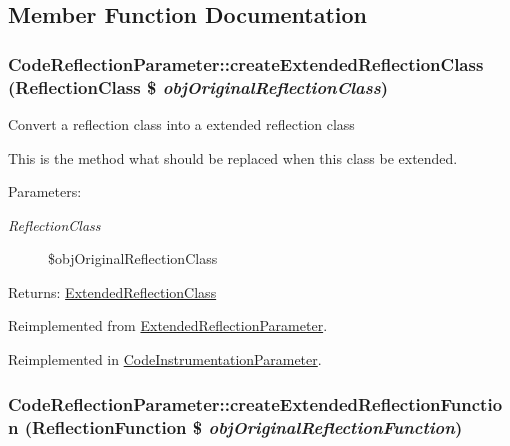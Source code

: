 \subsection{Member Function Documentation}
\hypertarget{class_code_reflection_parameter_a2b9b21f9711afbf11791dd64dcbdd0a}{
\subsubsection[{createExtendedReflectionClass}]{\setlength{\rightskip}{0pt plus 5cm}CodeReflectionParameter::createExtendedReflectionClass (ReflectionClass \$ {\em objOriginalReflectionClass})}}
\label{class_code_reflection_parameter_a2b9b21f9711afbf11791dd64dcbdd0a}


Convert a reflection class into a extended reflection class

This is the method what should be replaced when this class be extended.

\begin{Desc}
\item[Parameters:]
\begin{description}
\item[{\em ReflectionClass}]\$objOriginalReflectionClass \end{description}
\end{Desc}
\begin{Desc}
\item[Returns:]\hyperlink{class_extended_reflection_class}{ExtendedReflectionClass} \end{Desc}


Reimplemented from \hyperlink{class_extended_reflection_parameter_7119682d1601c3398cbad195a4d52b4a}{ExtendedReflectionParameter}.

Reimplemented in \hyperlink{class_code_instrumentation_parameter_4190025f9ec55f58f10b36084a8851fd}{CodeInstrumentationParameter}.\hypertarget{class_code_reflection_parameter_5e6e7a1f49ff1f404342a2b2d4a15aa3}{
\subsubsection[{createExtendedReflectionFunction}]{\setlength{\rightskip}{0pt plus 5cm}CodeReflectionParameter::createExtendedReflectionFunction (ReflectionFunction \$ {\em objOriginalReflectionFunction})}}
\label{class_code_reflection_parameter_5e6e7a1f49ff1f404342a2b2d4a15aa3}


